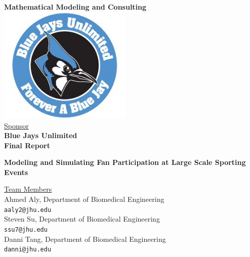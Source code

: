 \documentclass[oneside,12pt]{report}
\begin{document}
\def\thefootnote{\fnsymbol{footnote}}

\thispagestyle{empty}

\def\shiftdowna{0.32in}  %
\def\shiftdownb{0.22in}  %


\begin{center}
\textbf{{\large Mathematical Modeling and Consulting }}\\

\vspace \shiftdowna
\includegraphics[width=2.5in]{BJU.jpg}\\

\vspace \shiftdowna
\underline {Sponsor}\\ 
\vspace{5pt}
\textbf{\large Blue Jays Unlimited} \\
\vspace\shiftdowna
\textbf{{Final Report}}

\vspace \shiftdowna
\textbf{{\Large Modeling and Simulating Fan Participation at Large Scale Sporting Events}}

\vspace{0.35in}
\underline {Team Members}\\
\vspace{5pt}
Ahmed Aly, Department of Biomedical Engineering\\
\texttt{aaly2@jhu.edu} \\
\vspace{5pt}
Steven Su, Department of Biomedical Engineering\\
\texttt{ssu7@jhu.edu} \\
\vspace{5pt}
Danni Tang, Department of Biomedical Engineering\\
\texttt{danni@jhu.edu} \\


\end{center}
\end{document}
